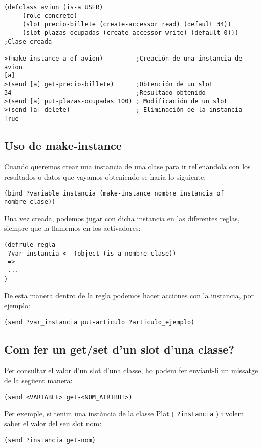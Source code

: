 \documentclass[11pt,svgnames]{scrbook}
\begin{document}
\begin{verbatim}
(defclass avion (is-a USER)
     (role concrete)
     (slot precio-billete (create-accessor read) (default 34))
     (slot plazas-ocupadas (create-accessor write) (default 0)))
;Clase creada

>(make-instance a of avion)         ;Creación de una instancia de avion
[a]
>(send [a] get-precio-billete)      ;Obtención de un slot
34                                  ;Resultado obtenido
>(send [a] put-plazas-ocupadas 100) ; Modificación de un slot
>(send [a] delete)                  ; Eliminación de la instancia
True
\end{verbatim} 


\subsection{Uso de make-instance}

Cuando queremos crear una instancia de una clase para ir rellenandola con los
resultados o datos que vayamos obteniendo se haria lo siguiente:
\medskip

\texttt{(bind ?variable\_instancia (make-instance nombre\_instancia of
nombre\_clase))}
\medskip

Una vez creada, podemos jugar con dicha instancia en las diferentes reglas,
siempre que la llamemos en los activadores:

\begin{verbatim}
(defrule regla
 ?var_instancia <- (object (is-a nombre_clase))
 => 
 ...
)\end{verbatim} 

De esta manera dentro de la regla podemos hacer acciones con la instancia, por
ejemplo:
\medskip

\texttt{(send ?var\_instancia put-articulo ?articulo\_ejemplo)}

\subsection{Com fer un get/set d'un slot d'una classe?}


Per consultar el valor d'un slot d'una classe, ho podem fer enviant-li un
missatge de la següent manera:
\medskip

\texttt{(send <VARIABLE> get-<NOM\_ATRIBUT>)}
\medskip

Per exemple, si tenim una instància de la classe Plat ( \texttt{?instancia} ) i
volem saber el valor del seu slot nom:
\medskip

\texttt{(send ?instancia get-nom)}
\medskip
\end{document}
